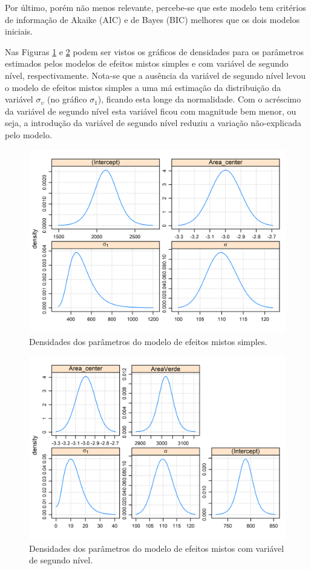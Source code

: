 \documentclass[
  a4paper, 11pt]{article}
\begin{document}
Por último, porém não menos relevante, percebe-se que este modelo tem
critérios de informação de Akaike (AIC) e de Bayes (BIC) melhores que os
dois modelos iniciais.

Nas Figuras \ref{fig:pr} e \ref{fig:pr1} podem ser vistos os gráficos de
densidades para os parâmetros estimados pelos modelos de efeitos mistos
simples e com variável de segundo nível, respectivamente. Nota-se que a
ausência da variável de segundo nível levou o modelo de efeitos mistos
simples a uma má estimação da distribuição da variável
\(\sigma_\upsilon\) (no gráfico \(\sigma_1\)), ficando esta longe da
normalidade. Com o acréscimo da variável de segundo nível esta variável
ficou com magnitude bem menor, ou seja, a introdução da variável de
segundo nível reduziu a variação não-explicada pelo modelo.

\begin{figure}[H]

{\centering \includegraphics[width=0.7\linewidth]{images/pr-1} 

}

\caption{Densidades dos parâmetros do modelo de efeitos mistos simples.}\label{fig:pr}
\end{figure}

\begin{figure}[H]

{\centering \includegraphics[width=0.7\linewidth]{images/pr1-1} 

}

\caption{Densidades dos parâmetros do modelo de efeitos mistos com variável de segundo nível.}\label{fig:pr1}
\end{figure}
\end{document}
